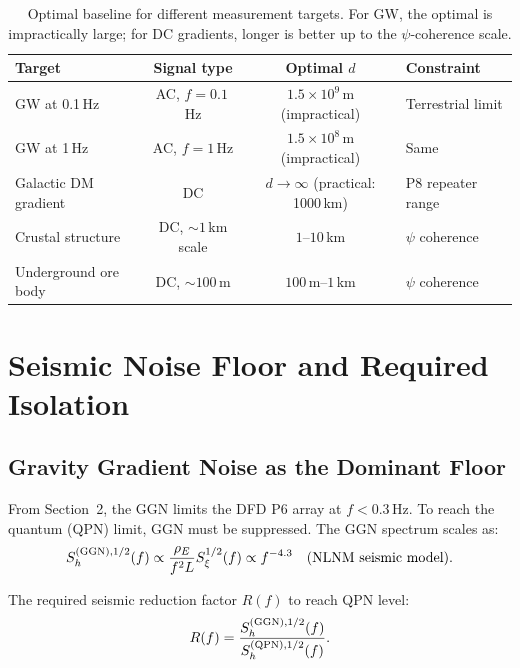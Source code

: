 \documentclass[11pt]{article}
\theoremstyle{definition}
\theoremstyle{remark}
\begin{document}
\begin{table}[h]
\centering
\caption{Optimal baseline for different measurement targets. For GW, the
optimal is impractically large; for DC gradients, longer is better up to
the $\psi$-coherence scale.}
\begin{tabular}{@{}lccl@{}}
\toprule
Target & Signal type & Optimal $d$ & Constraint \\
\midrule
GW at 0.1\,Hz & AC, $f=0.1$\,Hz & $1.5\times10^9$\,m (impractical) & Terrestrial limit \\
GW at 1\,Hz & AC, $f=1$\,Hz & $1.5\times10^8$\,m (impractical) & Same \\
Galactic DM gradient & DC & $d \to \infty$ (practical: 1000\,km) & P8 repeater range \\
Crustal structure & DC, $\sim 1$\,km scale & $1$--$10$\,km & $\psi$ coherence \\
Underground ore body & DC, $\sim 100$\,m & $100$\,m--$1$\,km & $\psi$ coherence \\
\bottomrule
\end{tabular}
\end{table}

\section{Seismic Noise Floor and Required Isolation}
\label{sec:seismic}

\subsection{Gravity Gradient Noise as the Dominant Floor}

From Section~2, the GGN limits the DFD P6 array at $f < 0.3$\,Hz. To reach
the quantum (QPN) limit, GGN must be suppressed. The GGN spectrum scales as:
\begin{equation}
S_h^{(\rm GGN),1/2}(f) \propto \frac{\rho_E}{f^2 L} S_\xi^{1/2}(f)
\propto f^{-4.3}
\quad (\text{NLNM seismic model}).
\end{equation}

The required seismic reduction factor $R(f)$ to reach QPN level:
\begin{equation}
R(f) = \frac{S_h^{(\rm GGN),1/2}(f)}{S_h^{(\rm QPN),1/2}(f)}.
\end{equation}
\end{document}
